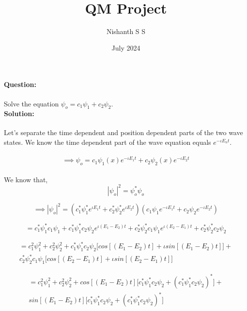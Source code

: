 \documentclass[12pt]{article}
\title{QM Project}
\author{Nishanth S S}
\date{July 2024}
\begin{document}
\maketitle

\noindent
\textbf{Question:}
\\
\\
Solve the equation $ \psi_o = c_1 \psi_1 + c_2 \psi_2. $ 
\\

\noindent
\textbf{Solution:}
\\
\\
Let's separate the  time dependent and position dependent parts of the two wave states. We know the time dependent part of the wave equation equals $ e^{-\iota E_n t}$. 
\\
\\
\[ \implies \psi_o = c_1 \psi_1(x) e^{-\iota E_1 t} + c_2 \psi_2(x) e^{-\iota E_2 t}\]
\\

We know that, \[ |\psi_o|^2 = \psi_o^* \psi_o \]

\[ \implies |\psi_o|^2 = (c_1^* \psi_1^* e^{\iota E_1 t} + c_2^* \psi_2^* e^{\iota E_2 t})(c_1 \psi_1 e^{-\iota E_1 t} + c_2 \psi_2 e^{-\iota E_2 t})\]

\[ = c_1^* \psi_1^* c_1 \psi_1 + c_1^* \psi_1^* c_2 \psi_2 e^{\iota (E_1 - E_2)t} + c_2^* \psi_2^* c_1 \psi_1 e^{\iota (E_2 - E_1)t} + c_2^* \psi_2^* c_2 \psi_2 \]

\begin{multline*}
= c_1^2 \psi_1^2 + c_2^2 \psi_2^2 + c_1^* \psi_1^* c_2 \psi_2 \Big [cos[(E_1 - E_2)t] + \iota sin[(E_1 - E_2)t] \Big]   + 
\\
c_2^* \psi_2^* c_1 \psi_1 \Big [cos[(E_2 - E_1)t] + \iota sin[(E_2 - E_1)t] \Big] 
\end{multline*}

\begin{multline*}
= c_1^2 \psi_1^2 + c_2^2 \psi_2^2 +  cos[(E_1 - E_2)t] \Big [c_1^* \psi_1^* c_2 \psi_2 + (c_1^* \psi_1^* c_2 \psi_2)^* \Big ] + 
\\
sin[(E_1 - E_2)t] \Big[ c_1^* \psi_1^* c_2 \psi_2 + (c_1^* \psi_1^* c_2 \psi_2)^* \Big]
\end{multline*}
\end{document}
